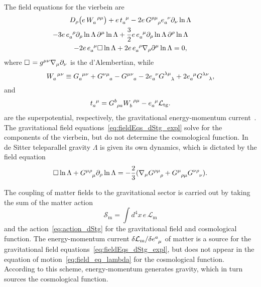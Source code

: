 \documentclass[%
5p,
times,
sort&compress
]{elsarticle}
\newcommand{\ind}{\indices}
\def\pd{\partial}
\def\mc{\mathcal}
\def\mrm{\mathrm}
\begin{document}
The field equations for the vierbein are
\begin{multline}
\label{eq:fieldEqs_dStg_expl}
   D_\rho \big(e\, W\ind{_a^{\rho\mu}}\big) + e\, t\ind{_a^\mu} 
   - 2e\, G\ind{^{\rho\mu}_\rho} e\ind{_a^\nu} \pd_\nu \ln 
   \Lambda \\ - 3 e\, e\ind{_a^\rho} \pd_\rho \ln \Lambda\, 
   \pd^\mu \ln \Lambda
   + \frac{3}{2} e\, e\ind{_a^\mu} \pd_\rho \ln \Lambda\, 
   \pd^\rho \ln \Lambda \hspace{1cm}
   \\
   - 2e\, e\ind{_a^\mu} \Box \ln \Lambda + 2e\, e\ind{_a^\rho} 
   \nabla_\rho \pd^\mu \ln \Lambda = 0,
\end{multline}
where $\Box\hspace{0.1em} = g^{\mu\nu} \nabla_\mu \pd_\nu$ is the 
d'Alembertian, while
\begin{equation*}
  W\ind{_a^{\mu\nu}} \equiv G\ind{_a^{\mu\nu}} 
  + G\ind{^{\nu\mu}_a} - G\ind{^{\mu\nu}_a} \\
  - 2e\ind{_a^\nu} G\ind{^{\lambda\mu}_\lambda} + 2e\ind{_a^\mu} 
  G\ind{^{\lambda\nu}_\lambda},
\end{equation*}
and
\begin{equation*}
  t\ind{_a^\mu} = G\ind{^b_{\rho a}} W\ind{_b^{\rho\mu}} 
  - e\ind{_a^\mu} \mathcal{L}_\mrm{tg}.
\end{equation*}
are the superpotential, respectively, the gravitational 
energy-momentum current~\cite{Maluf:2013gaa}. The gravitational 
field equations~\eqref{eq:fieldEqs_dStg_expl} solve for the 
components of the vierbein, but do not determine the cosmological 
function. In de Sitter teleparallel gravity $\Lambda$ is given 
its own dynamics, which is dictated by the field equation
\begin{equation}
\label{eq:field_eq_lambda}
  \Box \ln \Lambda + G\ind{^{\mu\rho}_\mu} \pd_\rho \ln \Lambda =
  -\frac{2}{3} ( \nabla_\mu G\ind{^{\rho\mu}_\rho} 
  + G\ind{^\mu_{\rho\mu}} G\ind{^{\nu\rho}_\nu} ).
\end{equation}

The coupling of matter fields to the gravitational sector is 
carried out by taking the sum of the matter action
\begin{equation*}
  \mc{S}_\mrm{m} = \int d^4x \, e \, \mc{L}_\mrm{m}
\end{equation*}
and the action~\eqref{eq:action_dStg} for the gravitational field 
and cosmological function. The energy-momentum current $\delta 
\mc{L}_\mrm{m}/\delta e\ind{^a_\mu}$ of matter is a source for 
the gravitational field equations~\eqref{eq:fieldEqs_dStg_expl}, 
but does not appear in the equation of 
motion~\eqref{eq:field_eq_lambda} for the cosmological function.  
According to this scheme, energy-momentum generates gravity, 
which in turn sources the cosmological function.
\end{document}
